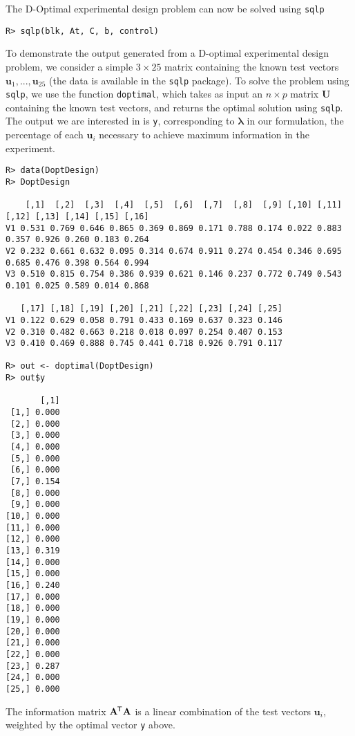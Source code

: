 \documentclass{article}
\newcommand{\ve}[1]{\mathbf{#1}}           %
\newcommand{\sv}[1]{\boldsymbol{#1}}   %
\newcommand{\m}[1]{\mathbf{#1}}               %
\newcommand{\tr}[1]{{#1}^{\mkern-1.5mu\mathsf{T}}}              %
\begin{document}
The D-Optimal experimental design problem can now be solved using \verb!sqlp!

\begin{verbatim}
R> sqlp(blk, At, C, b, control)
\end{verbatim}

To demonstrate the output generated from a D-optimal experimental design problem, we consider a simple $3 \times 25$ matrix containing the known test vectors $\ve{u}_{1},...,\ve{u}_{25}$ (the data is available in the \verb!sqlp! package). To solve the problem using \verb!sqlp!, we use the function \verb!doptimal!, which takes as input an $n \times p$ matrix $\m{U}$ containing the known test vectors, and returns the optimal solution using \verb!sqlp!. The output we are interested in is \verb!y!, corresponding to $\sv{\lambda}$ in our formulation, the percentage of each $\ve{u}_{i}$ necessary to achieve maximum information in the experiment.

\begin{verbatim}
R> data(DoptDesign)
R> DoptDesign

    [,1]  [,2]  [,3]  [,4]  [,5]  [,6]  [,7]  [,8]  [,9] [,10] [,11] [,12] [,13] [,14] [,15] [,16]
V1 0.531 0.769 0.646 0.865 0.369 0.869 0.171 0.788 0.174 0.022 0.883 0.357 0.926 0.260 0.183 0.264
V2 0.232 0.661 0.632 0.095 0.314 0.674 0.911 0.274 0.454 0.346 0.695 0.685 0.476 0.398 0.564 0.994
V3 0.510 0.815 0.754 0.386 0.939 0.621 0.146 0.237 0.772 0.749 0.543 0.101 0.025 0.589 0.014 0.868

   [,17] [,18] [,19] [,20] [,21] [,22] [,23] [,24] [,25]
V1 0.122 0.629 0.058 0.791 0.433 0.169 0.637 0.323 0.146
V2 0.310 0.482 0.663 0.218 0.018 0.097 0.254 0.407 0.153
V3 0.410 0.469 0.888 0.745 0.441 0.718 0.926 0.791 0.117

R> out <- doptimal(DoptDesign)
R> out$y

       [,1]
 [1,] 0.000
 [2,] 0.000
 [3,] 0.000
 [4,] 0.000
 [5,] 0.000
 [6,] 0.000
 [7,] 0.154
 [8,] 0.000
 [9,] 0.000
[10,] 0.000
[11,] 0.000
[12,] 0.000
[13,] 0.319
[14,] 0.000
[15,] 0.000
[16,] 0.240
[17,] 0.000
[18,] 0.000
[19,] 0.000
[20,] 0.000
[21,] 0.000
[22,] 0.000
[23,] 0.287
[24,] 0.000
[25,] 0.000
\end{verbatim}

The information matrix $\tr{\m{A}}\m{A}$ is a linear combination of the test vectors $\ve{u}_{i}$, weighted by the optimal vector \verb!y! above. 



\end{document}
